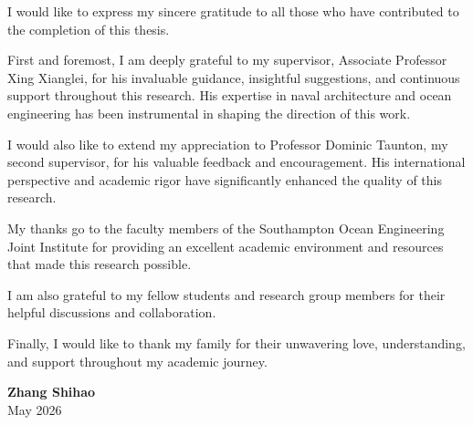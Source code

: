 
I would like to express my sincere gratitude to all those who have contributed to the completion of this thesis.

First and foremost, I am deeply grateful to my supervisor, Associate Professor Xing Xianglei, for his invaluable guidance, insightful suggestions, and continuous support throughout this research. His expertise in naval architecture and ocean engineering has been instrumental in shaping the direction of this work.

I would also like to extend my appreciation to Professor Dominic Taunton, my second supervisor, for his valuable feedback and encouragement. His international perspective and academic rigor have significantly enhanced the quality of this research.

My thanks go to the faculty members of the Southampton Ocean Engineering Joint Institute for providing an excellent academic environment and resources that made this research possible.

I am also grateful to my fellow students and research group members for their helpful discussions and collaboration.

Finally, I would like to thank my family for their unwavering love, understanding, and support throughout my academic journey.

\vspace{1cm}
\begin{flushright}
\textbf{Zhang Shihao}\\
May 2026
\end{flushright}
